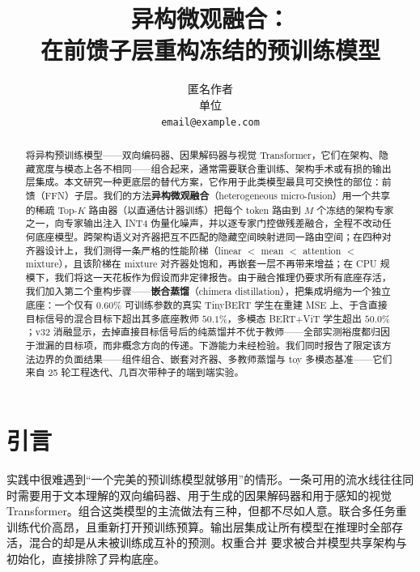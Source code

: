 \documentclass[10pt,twoside]{article}
\title{异构微观融合：\\ 在前馈子层重构冻结的预训练模型}
\author{
    匿名作者\\
    单位\\
    \texttt{email@example.com}
}
\begin{document}
\maketitle

\vspace{-0.5em}
\begin{center}
\end{center}
\vspace{0.5em}

\begin{abstract}
将异构预训练模型——双向编码器、因果解码器与视觉 Transformer，它们在架构、隐藏宽度与模态上各不相同——组合起来，通常需要联合重训练、架构手术或有损的输出层集成。本文研究一种更底层的替代方案，它作用于此类模型最具可交换性的部位：前馈（FFN）子层。我们的方法\textbf{异构微观融合}（heterogeneous micro-fusion）用一个共享的稀疏 Top-$K$ 路由器（以直通估计器训练）把每个 token 路由到 $M$ 个冻结的架构专家之一，向专家输出注入 INT4 伪量化噪声，并以逐专家门控做残差融合，全程不改动任何底座模型。跨架构语义对齐器把互不匹配的隐藏空间映射进同一路由空间；在四种对齐器设计上，我们测得一条严格的性能阶梯（linear $<$ mean $<$ attention $<$ mixture），且该阶梯在 mixture 对齐器处饱和，再嵌套一层不再带来增益；在 CPU 规模下，我们将这一天花板作为假设而非定律报告。由于融合推理仍要求所有底座存活，我们加入第二个重构步骤——\textbf{嵌合蒸馏}（chimera distillation），把集成坍缩为一个独立底座：一个仅有 $0.60\%$ 可训练参数的真实 TinyBERT 学生在重建 MSE 上、于含直接目标信号的混合目标下超出其多底座教师 $50.1\%$，多模态 BERT+ViT 学生超出 $50.0\%$；v32 消融显示，去掉直接目标信号后的纯蒸馏并不优于教师——全部实测裕度都归因于泄漏的目标项，而非概念方向的传递。下游能力未经检验。我们同时报告了限定该方法边界的负面结果——组件组合、嵌套对齐器、多教师蒸馏与 toy 多模态基准——它们来自 25 轮工程迭代、几百次带种子的端到端实验。
\end{abstract}

\section{引言}
\label{sec:intro}

实践中很难遇到``一个完美的预训练模型就够用''的情形。一条可用的流水线往往同时需要用于文本理解的双向编码器、用于生成的因果解码器和用于感知的视觉 Transformer。组合这类模型的主流做法有三种，但都不尽如人意。联合多任务重训练代价高昂，且重新打开预训练预算。输出层集成让所有模型在推理时全部存活，混合的却是从未被训练成互补的预测。权重合并 \citep{ilharco2023,yadav2023} 要求被合并模型共享架构与初始化，直接排除了异构底座。
\end{document}

